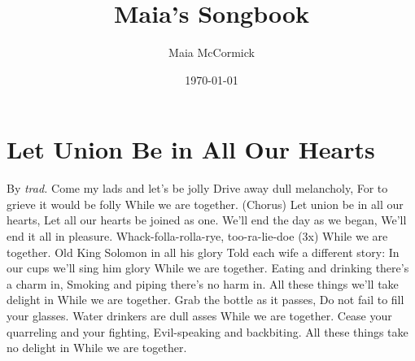 \documentclass{book}%
\title{Maia's Songbook}%
\author{Maia McCormick}%
\date{\today}%
\begin{document}
%
\normalsize%
%
\maketitle%
\tableofcontents%
%
\chapter{Let Union Be in All Our Hearts}%
By %
\textit{trad.}%
\newline%
Come my lads and let's be jolly\newline%
Drive away dull melancholy,\newline%
For to grieve it would be folly\newline%
While we are together.\newline%
\newline%
(Chorus)\newline%
Let union be in all our hearts,\newline%
Let all our hearts be joined as one.\newline%
We'll end the day as we began,\newline%
We'll end it all in pleasure.\newline%
Whack{-}folla{-}rolla{-}rye, too{-}ra{-}lie{-}doe (3x)\newline%
While we are together.\newline%
\newline%
Old King Solomon in all his glory\newline%
Told each wife a different story:\newline%
In our cups we'll sing him glory\newline%
While we are together.\newline%
\newline%
Eating and drinking there's a charm in,\newline%
Smoking and piping there's no harm in.\newline%
All these things we'll take delight in\newline%
While we are together.\newline%
\newline%
Grab the bottle as it passes,\newline%
Do not fail to fill your glasses.\newline%
Water drinkers are dull asses\newline%
While we are together.\newline%
\newline%
Cease your quarreling and your fighting,\newline%
Evil{-}speaking and backbiting.\newline%
All these things take no delight in\newline%
While we are together.\newline%
%
\end{document}
